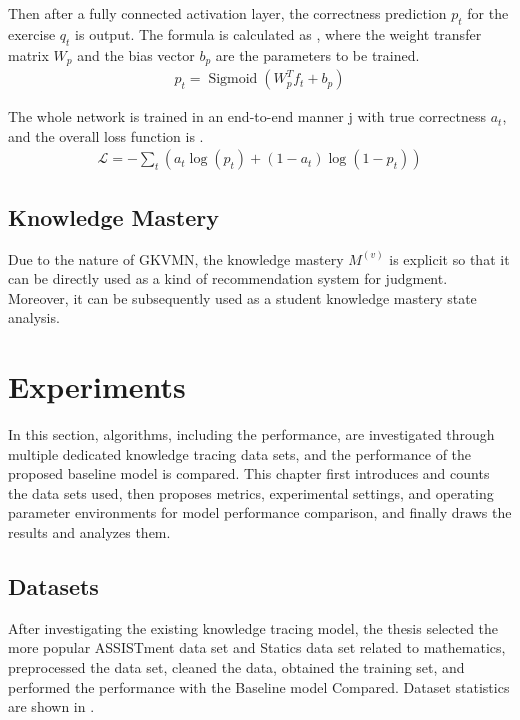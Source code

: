 Then after a fully connected activation layer, the correctness prediction \(p_t\) for the exercise \(q_t\) is output. The formula is calculated as \eqname{\ref{fml:ch3-predicting-function-p}}, where the weight transfer matrix \(W_p\) and the bias vector \(b_p\) are the parameters to be trained.
\begin{align}\label{fml:ch3-predicting-function-p}
    p_t = \operatorname{Sigmoid}(W_p^T f_t + b_p)
\end{align}

The whole network is trained in an end-to-end manner j with true correctness \(a_t\), and the overall loss function is \eqname{\ref{fml:ch3-loss}}.
\begin{align}\label{fml:ch3-loss}
    \mathcal{L} = -\sum\limits_{t}{(a_t\log(p_t)+(1-a_t)\log(1-p_t))}
\end{align}


\subsection{Knowledge Mastery}
Due to the nature of GKVMN, the knowledge mastery \(M^{(v)}\) is explicit so that it can be directly used as a kind of recommendation system for judgment. Moreover, it can be subsequently used as a student knowledge mastery state analysis.

\section{Experiments}
In this section, algorithms, including the performance, are investigated through multiple dedicated knowledge tracing data sets, and the performance of the proposed baseline model is compared. This chapter first introduces and counts the data sets used, then proposes metrics, experimental settings, and operating parameter environments for model performance comparison, and finally draws the results and analyzes them.

\subsection{Datasets}
After investigating the existing knowledge tracing model, the thesis selected the more popular ASSISTment data set and Statics data set related to mathematics, preprocessed the data set, cleaned the data, obtained the training set, and performed the performance with the Baseline model Compared. Dataset statistics are shown in \tblname{}.

